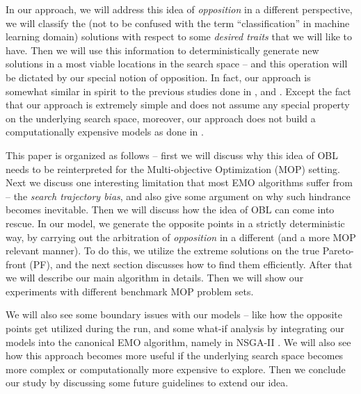 \documentclass{sig-alternate-05-2015}
\begin{document}
In our approach, we will address this idea of \textit{opposition} in a different perspective, we will classify the (not to be confused with the term ``classification'' in machine learning domain) solutions with respect to some \textit{desired traits} that we will like to have. Then we will use this information to deterministically generate new solutions in a most viable locations in the search space -- and this operation will be dictated by our special notion of opposition. In fact, our approach is somewhat similar in spirit to the previous studies done in \cite{sts-1}, \cite{sts-2} and \cite{directional-mutation}. Except the fact that our approach is extremely simple and does not assume any special property on the underlying search space, moreover, our approach does not build a computationally expensive models as done in \cite{search-history}\cite{segment-search}.

This paper is organized as follows -- first we will discuss why this idea of OBL needs to be reinterpreted for the Multi-objective Optimization (MOP) setting. Next we discuss one interesting limitation that most EMO algorithms suffer from -- the \textit{search trajectory bias}, and also give some argument on why such hindrance becomes inevitable. Then we will discuss how the idea of OBL can come into rescue. In our model, we generate the opposite points in a strictly deterministic way, by carrying out the arbitration of \textit{opposition} in a different (and a more MOP relevant manner). To do this, we utilize the extreme solutions on the true Pareto-front (PF), and the next section discusses how to find them efficiently. After that we will describe our main algorithm in details. Then we will show our experiments with different benchmark MOP problem sets. 

We will also see some boundary issues with our models -- like how the opposite points get utilized during the run, and some what-if analysis by integrating our models into the canonical EMO algorithm, namely in NSGA-II \cite{nsga2-main}. We will also see how this approach becomes more useful if the underlying search space becomes more complex or computationally more expensive to explore. Then we conclude our study by discussing some future guidelines to extend our idea.
\end{document}
